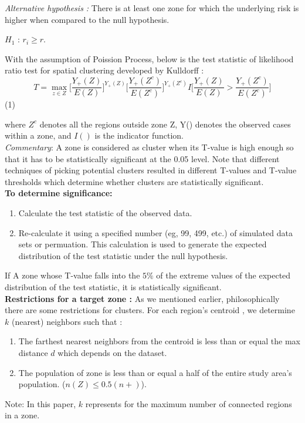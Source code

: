 \documentclass[12pt]{article}
\begin{document}
			
			\textit{Alternative hypothesis :} There is at least one zone for which the underlying risk is higher when compared to the null hypothesis. \\
 			\begin{center}
			$H_1$ : $r_i \geq r$. \\
			\end{center}	
			With the assumption of Poission Process, below is the test statistic of likelihood ratio test for spatial clustering developed by Kulldorff : \\
				\[
					T = \max_{z\in Z} \bigg[\dfrac{Y_+(Z)}{E(Z)}\bigg]^{Y_+(Z)} \bigg[\dfrac{Y_+(Z^c)}{E(Z^c)}\bigg]^{Y_+(Z^c)} I\bigg[\dfrac{Y_+(Z)}{E(Z)} > \dfrac{Y_+(Z^c)}{E(Z^c)}\bigg]
				\]	  (1)
		
				where $ Z^c$ denotes all the regions outside zone Z, Y() denotes the observed cases within a zone, and $I()$ is the indicator function. \\ 
			
			 \textit{Commentary}: A zone is considered as cluster when its T-value is high enough so that it has to be statistically significant at the 0.05 level. Note that different techniques of picking potential clusters resulted in different T-values and T-value thresholds which determine whether clusters are statistically significant. \\
			 
			 \textbf{To determine significance:} \\
			 \begin{enumerate}
			 \item Calculate the test statistic of the observed data.	
			 \item Re-calculate it using a specified number (eg, 99, 499, etc.) of simulated data sets or permuation. This calculation is used to generate the expected distribution of the test statistic under the null hypothesis. 
			 \end{enumerate}
			 If A zone whose T-value falls into the $5\%$ of the extreme values of the expected distribution of the test statistic, it is statistically significant. \\
			
			\textbf{Restrictions for a target zone : } As we mentioned earlier, philosophically there are some restrictions for clusters. For each region's centroid , we determine $k$ (nearest) neighbors such that : \\
				\begin{enumerate}
					\item The farthest nearest neighbors from the centroid is less than or equal the max distance $d$ which depends on the dataset. \\ 
					\item The population of zone is less than or equal a half of the entire study area's population. ($n(Z) \leq 0.5(n+)$).\\
				\end{enumerate}
				Note: In this paper, $k$ represents for the maximum number of connected regions in a zone.\\
\end{document}
